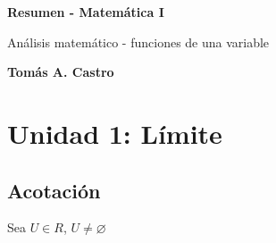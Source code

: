 \documentclass{report}
\begin{document}
	
\begin{titlepage}
	\begin{center}
		\vspace*{7cm}
		
		\Huge
		\textbf{Resumen - Matemática I}
		
		\vspace{1cm}
		\LARGE
		Análisis matemático - funciones de una variable
		
		\vspace{1.5cm}
		
		\textbf{Tomás A. Castro}
		
		
	\end{center}
\end{titlepage}

\renewcommand{\abstractname}{\Huge ACLARACIÓN\\}
\begin{abstract}
	
	{\Large Este es mi resumen de Matemática 1, como práctica para iniciarme en \LaTeX. Espero que el que quiera evacuar sus dudas sobre algún tema en alguna unidad le sirva para algo. Incluí algunas demostraciones que me parecieron interesantes, y también en varios casos complementé la teoría con observaciones personales mías.
	
	\textbf{Este material sólo de consulta. No utilizar en reemplazo del material o apuntes de estudio que ofrezca la cátedra.}
	
	Cualquier \href{https://github.com/Gumption-design/Matem-tica-I---Resumen/tree/main}{colaboración} o sugerencia es bienvenida.
	
	\
	
	Tomás A. Castro
	
	tomacastro@itba.edu.ar}
\end{abstract}

\tableofcontents

\chapter{Unidad 1: Límite}
	\section{Acotación}
		Sea $U \in R$, $U \neq \varnothing$
	
\end{document}
